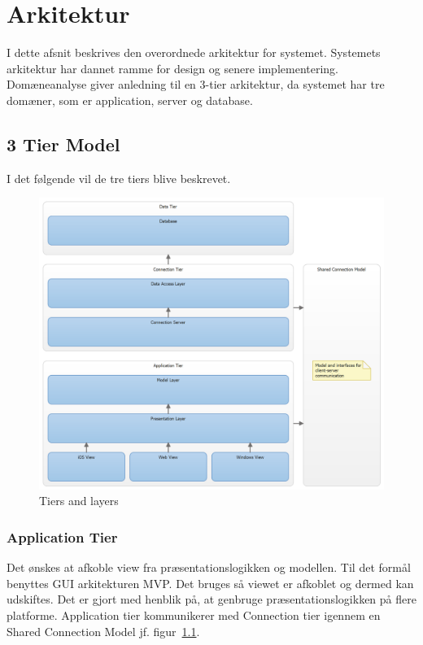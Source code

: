 \chapter{Arkitektur}
I dette afsnit beskrives den overordnede arkitektur for systemet. Systemets arkitektur har dannet ramme for design og senere implementering. Domæneanalyse giver anledning til en 3-tier arkitektur, da systemet har tre domæner, som er application, server og database.

\section{3 Tier Model}

I det følgende vil de tre tiers blive beskrevet.

\begin{figure}
	\centering
	\includegraphics[width=\linewidth]{figs/arkitektur/Smartpool_tiersnlayers}
	\caption{Tiers and layers}
	\label{fig:tiersnlayers}
\end{figure}

\subsection{Application Tier}
Det ønskes at afkoble view fra præsentationslogikken og modellen. Til det formål benyttes GUI arkitekturen MVP. Det bruges så viewet er afkoblet og dermed kan udskiftes. Det er gjort med henblik på, at genbruge præsentationslogikken på flere platforme. Application tier kommunikerer med Connection tier igennem en Shared Connection Model jf. figur~\ref{fig:tiersnlayers}. 

